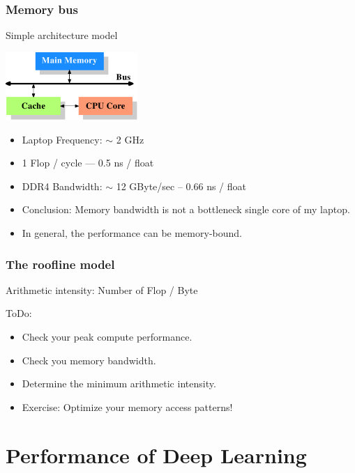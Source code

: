 \documentclass[t, 10pt, aspectratio=1610]{beamer}
\begin{document}
\begin{frame}[fragile]
\frametitle{Memory bus}

Simple architecture model
 \begin{center}
\includegraphics[width=5cm]{cpumemory.1.png}
\end{center}

\begin{itemize}
    \item Laptop Frequency: $\sim$ 2 GHz
    \item 1 Flop / cycle --- 0.5 ns / float
    \item DDR4 Bandwidth: $\sim$ 12 GByte/sec -- 0.66 ns / float
    \item Conclusion: Memory bandwidth is not a bottleneck single core of my laptop.
    \item In general, the performance can be memory-bound. 
\end{itemize}

\end{frame}

\begin{frame}[fragile]
\frametitle{The roofline model}

Arithmetic intensity: Number of Flop / Byte
 \begin{center}

\end{center}

ToDo:
\begin{itemize}
    \item Check your peak compute performance.
    \item Check you memory bandwidth.
    \item Determine the minimum arithmetic intensity.
    \item Exercise: Optimize your memory access patterns! 
\end{itemize}

\end{frame}

\section{Performance of Deep Learning}
\end{document}
